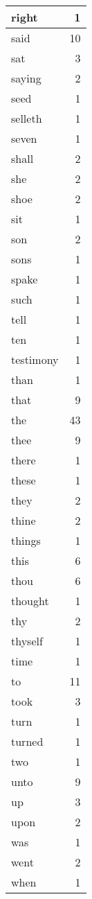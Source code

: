 \begin{center}
\begin{longtable}{l|r}
right & 1 \\ \hline
said & 10 \\ \hline
sat & 3 \\ \hline
saying & 2 \\ \hline
seed & 1 \\ \hline
selleth & 1 \\ \hline
seven & 1 \\ \hline
shall & 2 \\ \hline
she & 2 \\ \hline
shoe & 2 \\ \hline
sit & 1 \\ \hline
son & 2 \\ \hline
sons & 1 \\ \hline
spake & 1 \\ \hline
such & 1 \\ \hline
tell & 1 \\ \hline
ten & 1 \\ \hline
testimony & 1 \\ \hline
than & 1 \\ \hline
that & 9 \\ \hline
the & 43 \\ \hline
thee & 9 \\ \hline
there & 1 \\ \hline
these & 1 \\ \hline
they & 2 \\ \hline
thine & 2 \\ \hline
things & 1 \\ \hline
this & 6 \\ \hline
thou & 6 \\ \hline
thought & 1 \\ \hline
thy & 2 \\ \hline
thyself & 1 \\ \hline
time & 1 \\ \hline
to & 11 \\ \hline
took & 3 \\ \hline
turn & 1 \\ \hline
turned & 1 \\ \hline
two & 1 \\ \hline
unto & 9 \\ \hline
up & 3 \\ \hline
upon & 2 \\ \hline
was & 1 \\ \hline
went & 2 \\ \hline
when & 1 \\ \hline

\end{longtable}
\end{center}
